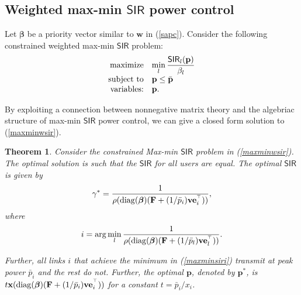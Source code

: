 \documentclass[10pt,twocolumn]{IEEEtran}
\newcommand{\0}{\mathbf{0}}
\newcommand{\1}{\mathbf{1}}
\def\diag{\mathop{{\rm diag}}\nolimits}
\newcommand{\trans}{^\top}
\newtheorem{theorem}{Theorem}
\begin{document}
\subsection{Weighted max-min $\mathsf{SIR}$ power control}
Let $\boldsymbol{\beta}$ be a priority vector similar to $\mathbf{w}$ in (\ref{sapc}). Consider the following constrained weighted max-min $\mathsf{SIR}$ problem:
\begin{equation}
\label{maxminwsir}
\begin{array}
[c]{rl}
\mbox{maximize} & \displaystyle \min_l \frac{\mathsf{SIR}_l(\mathbf{p})}{\beta_l} \\
\mbox{subject to} & \mathbf{p} \le \bar{\mathbf{p}} \\
\mbox{variables:} & \mathbf{p}.
\end{array}
\end{equation}

By exploiting a connection between nonnegative matrix theory and the algebriac structure of max-min $\mathsf{SIR}$ power control, we can give a closed form solution to (\ref{maxminwsir}).
\begin{theorem}
\label{maxminsirtheorem}
Consider the constrained Max-min $\mathsf{SIR}$ problem in (\ref{maxminwsir}). The optimal solution is such that the $\mathsf{SIR}$ for all users are equal. The optimal $\mathsf{SIR}$ is given by
\begin{equation}
\gamma^{\ast} = \frac{1}{\rho(\diag(\boldsymbol{\beta})(\mathbf{F}+(1/\bar{p}_i)\mathbf{v}\mathbf{e}_i^{\trans}))},
\end{equation}
where
\begin{equation}
\label{maxminsiri}
i = \arg \displaystyle \min_l \frac{1}{\rho(\diag(\boldsymbol{\beta})(\mathbf{F}+(1/\bar{p}_l)\mathbf{v}\mathbf{e}_l^{\trans}))}.
\end{equation}

Further, all links $i$ that achieve the minimum in (\ref{maxminsiri}) transmit at peak power $\bar{p}_i$ and the rest do not. Further, the optimal $\mathbf{p}$, denoted by $\mathbf{p}^{\ast}$, is $t \mathbf{x}(\diag(\boldsymbol{\beta})(\mathbf{F}+(1/\bar{p}_i)\mathbf{v}\mathbf{e}_i^{\trans}))$ for a constant $t=\bar{p}_i/x_i$.
\end{theorem}
\end{document}
